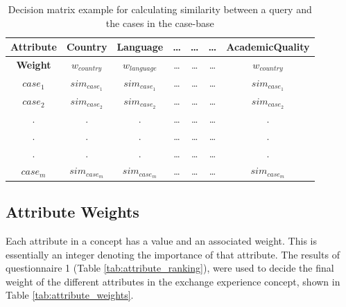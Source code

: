 \begin{table}[h]
\centering
\caption[Decision matrix for a query]{Decision matrix example for calculating similarity between a query and the cases in the case-base}
\label{tab:decision_matrix}
\begin{tabular}{|c|c|c|c|c|c|c|}
 \hline 
\textbf{Attribute}             & Country             & Language            & \ldots               & \ldots               & \ldots               & AcademicQuality     \\\hline 
\textbf{Weight}                & $w_{country}$         & $w_{language}$        & \ldots               & \ldots               & \ldots               & $w_{country}$         \\\hline \hline
$case_{1}$            & $sim_{case_{1}}$      & $sim_{case_{1}}$      & \ldots               & \ldots               & \ldots               & $sim_{case_{1}}$      \\
$case_{2}$            & $sim_{case_{2}}$      & $sim_{case_{2}}$      & \ldots               & \ldots               & \ldots               & $sim_{case_{2}}$      \\
. & . & . & \ldots               & \ldots               & \ldots               & . \\
. & . & . & \ldots               & \ldots               & \ldots               & . \\
. & . & . & \ldots               & \ldots               & \ldots               & . \\
$case_{m}$            & $sim_{case_{m}}$      & $sim_{case_{m}}$      & \ldots               & \ldots               & \ldots               & $sim_{case_{m}}$   \\ \hline 

\end{tabular}
\end{table}


\subsection{Attribute Weights}\label{sec:weighting}

Each attribute in a concept has a value and an associated weight. This is essentially an integer denoting the importance of that attribute. The results of questionnaire 1 (Table \ref{tab:attribute_ranking}), were used to decide the final weight of the different attributes in the exchange experience concept, shown in Table \ref{tab:attribute_weights}.

